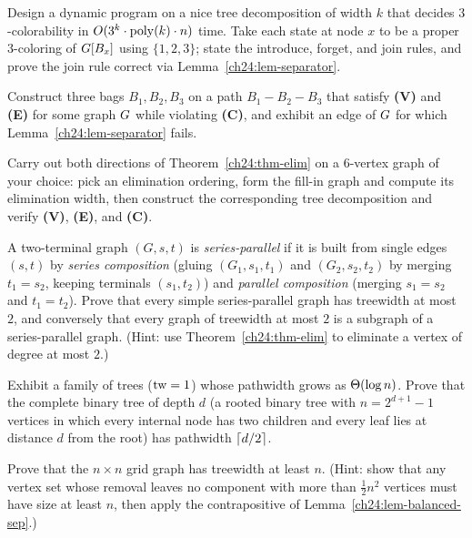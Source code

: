 \begin{exercise}
Design a dynamic program on a nice tree decomposition of width $k$ that decides
$3$-colorability in $O(3^k\cdot\operatorname{poly}(k)\cdot n)$ time. Take each state at node $x$
to be a proper $3$-coloring of $G[B_x]$ using $\{1,2,3\}$; state the introduce,
forget, and join rules, and prove the join rule correct via
Lemma~\ref{ch24:lem-separator}.
\end{exercise}

\begin{exercise}
Construct three bags $B_1,B_2,B_3$ on a path $B_1-B_2-B_3$ that satisfy \textbf{(V)}
and \textbf{(E)} for some graph $G$ while violating \textbf{(C)}, and exhibit an
edge of $G$ for which Lemma~\ref{ch24:lem-separator} fails.
\end{exercise}

\begin{exercise}[Elimination $=$ fill-in]
Carry out both directions of Theorem~\ref{ch24:thm-elim} on a $6$-vertex graph of
your choice: pick an elimination ordering, form the fill-in graph and compute its
elimination width, then construct the corresponding tree decomposition and verify
\textbf{(V)}, \textbf{(E)}, and \textbf{(C)}.
\end{exercise}

\begin{exercise}
A two-terminal graph $(G,s,t)$ is \emph{series-parallel} if it is built from single
edges $(s,t)$ by \emph{series composition} (gluing $(G_1,s_1,t_1)$ and
$(G_2,s_2,t_2)$ by merging $t_1=s_2$, keeping terminals $(s_1,t_2)$) and
\emph{parallel composition} (merging $s_1=s_2$ and $t_1=t_2$). Prove that every
simple series-parallel graph has treewidth at most $2$, and conversely that every
graph of treewidth at most $2$ is a subgraph of a series-parallel graph. (Hint: use
Theorem~\ref{ch24:thm-elim} to eliminate a vertex of degree at most $2$.)
\end{exercise}

\begin{exercise}
Exhibit a family of trees ($\operatorname{tw}=1$) whose pathwidth grows as $\Theta(\log n)$. Prove
that the complete binary tree of depth $d$ (a rooted binary tree with $n=2^{d+1}-1$
vertices in which every internal node has two children and every leaf lies at
distance $d$ from the root) has pathwidth $\lceil d/2\rceil$.
\end{exercise}

\begin{exercise}
Prove that the $n\times n$ grid graph has treewidth at least $n$. (Hint: show that
any vertex set whose removal leaves no component with more than $\tfrac12 n^2$
vertices must have size at least $n$, then apply the contrapositive of
Lemma~\ref{ch24:lem-balanced-sep}.)
\end{exercise}

